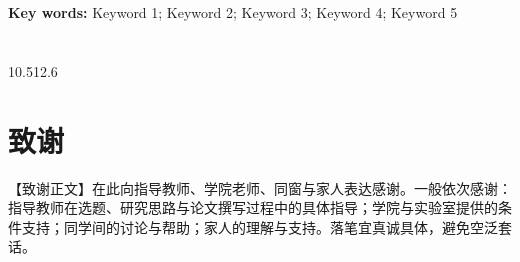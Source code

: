 \documentclass[12pt,a4paper,UTF8]{ctexart}
\makeatletter
\newlength{\tocwidth}
\renewcommand{\tableofcontents}{%
\section*{\contentsname}
\@mkboth{\MakeUppercase\contentsname}{\MakeUppercase\contentsname}
\centering
\begin{minipage}{\tocwidth}
    \@starttoc{toc}
\end{minipage}
}
\makeatother
\begin{document}
\vspace{1em}
{\bfseries Key words:}
Keyword 1; Keyword 2; Keyword 3; Keyword 4; Keyword 5

\newpage
{}
\pagestyle{empty}
\tableofcontents

\newpage
\pagestyle{fancy}
\setcounter{page}{1}



\clearpage


\clearpage


\clearpage


\clearpage


\clearpage

\clearpage
\begin{fontsize}{10.5}{12.6}\selectfont
\sloppy


\fussy
\end{fontsize}

\clearpage
\section*{致\quad 谢}

【致谢正文】在此向指导教师、学院老师、同窗与家人表达感谢。一般依次感谢：指导教师在选题、研究思路与论文撰写过程中的具体指导；学院与实验室提供的条件支持；同学间的讨论与帮助；家人的理解与支持。落笔宜真诚具体，避免空泛套话。


%
\end{document}
